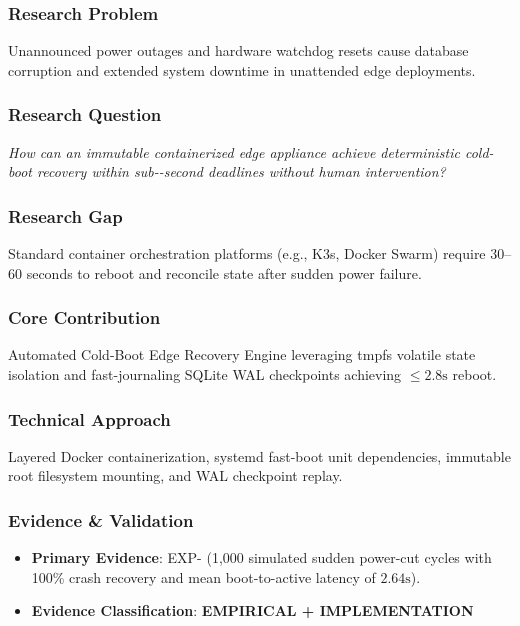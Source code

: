 \documentclass[11pt,letterpaper]{article}
\begin{document}
\subsubsection{Research Problem}
Unannounced power outages and hardware watchdog resets cause database corruption and extended system downtime in unattended edge deployments.

\subsubsection{Research Question}
\begin{tcolorbox}[colback=blue!3!white,colframe=blue!50!black,title=Primary Scientific Question]
\textit{How can an immutable containerized edge appliance achieve deterministic cold-\allowbreak boot recovery within sub--\allowbreak second deadlines without human intervention?}
\end{tcolorbox}

\subsubsection{Research Gap}
Standard container orchestration platforms (e.g., K3s, Docker Swarm) require 30–60 seconds to reboot and reconcile state after sudden power failure.

\subsubsection{Core Contribution}
Automated Cold-\allowbreak Boot Edge Recovery Engine leveraging tmpfs volatile state isolation and fast-\allowbreak journaling SQLite WAL checkpoints achieving $\le 2.8\text{s}$ reboot.

\subsubsection{Technical Approach}
Layered Docker containerization, systemd fast-\allowbreak boot unit dependencies, immutable root filesystem mounting, and WAL checkpoint replay.

\subsubsection{Evidence \& Validation}
\begin{itemize}[leftmargin=*]
    \item \textbf{Primary Evidence}: EXP- (1,000 simulated sudden power-\allowbreak cut cycles with 100\% crash recovery and mean boot-\allowbreak to-\allowbreak active latency of $2.64\text{s}$).
    \item \textbf{Evidence Classification}: \textbf{EMPIRICAL + IMPLEMENTATION}
\end{itemize}
\end{document}
